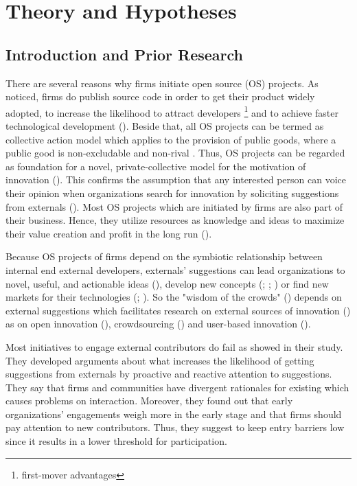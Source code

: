 \section{Theory and Hypotheses}

\subsection{Introduction and Prior Research}

There are several reasons why firms initiate open source (OS) projects. As \cite{west2003open} noticed, firms do publish source code in order to get their product widely adopted, to increase the likelihood to attract developers \footnote{first-mover advantages} and to achieve faster technological development (\cite{lerner2002some}). Beside that, all OS projects can be termed as collective action model which applies to the provision of public goods, where a public good is non-excludable and non-rival \cite[p.14]{olson2009logic}. Thus, OS projects can be regarded as foundation for a novel, private-collective model for the motivation of innovation (\cite{hippel2003open}). This confirms the assumption that any interested person can voice their opinion when organizations search for innovation by soliciting suggestions from externals (\cite{alexy2012managing}). Most OS projects which are initiated by firms are also part of their business. Hence, they utilize resources as knowledge and ideas to maximize their value creation and profit in the long run (\cite{dahlander2005relationships}).

Because OS projects of firms depend on the symbiotic relationship between internal end external developers, externals' suggestions can lead organizations to novel, useful, and actionable ideas (\cite{hill2009idea}), develop new concepts (\cite{katila2002something}; \cite{jeppesen2010marginality}; \cite{shane2000prior}) or find new markets for their technologies (\cite{gruber2008look}; \cite{shane2000prior}). So the "wisdom of the crowds" (\cite{surowiecki2005wisdom}) depends on external suggestions which facilitates research on external sources of innovation (\cite{dahlander2005relationships}) as on open innovation (\cite{chesbrough2003logic}), crowdsourcing (\cite{afuah2012crowdsourcing}) and user-based innovation (\cite{von1986lead}).

Most initiatives to engage external contributors do fail as \cite{dahlander2014open} showed in their study. They developed arguments about what increases the likelihood of getting suggestions from externals by proactive and reactive attention to suggestions. They say that firms and communities have divergent rationales for existing which causes problems on interaction. Moreover, they found out that early organizations' engagements weigh more in the early stage and that firms should pay attention to new contributors. Thus, they suggest to keep entry barriers low since it results in a lower threshold for participation.

